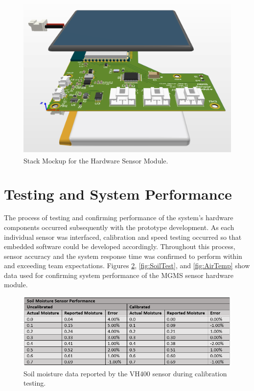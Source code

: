 \documentclass{report}
\begin{document}
\begin{figure}[H] %
    \centering
    \includegraphics[height=3.25in]{PNGs/FinalAssy.PNG}
    \caption{Stack Mockup for the Hardware Sensor Module.}
    \label{fig:Stackup}
\end{figure}

\newpage
\section{Testing and System Performance}

The process of testing and confirming performance of the system's hardware components occurred subsequently with the prototype development. As each individual sensor was interfaced, calibration and speed testing occurred so that embedded software could be developed accordingly. Throughout this process, sensor accuracy and the system response time was confirmed to perform within and exceeding team expectations. Figures \ref{fig:SoilMoist}, \ref{fig:SoilTest}, and \ref{fig:AirTemp} show data used for confirming system performance of the MGMS sensor hardware module.\\

\begin{figure}[H] %
    \centering
    \includegraphics{PNGs/SoilMoistData.PNG}
    \caption{Soil moisture data reported by the VH400 sensor during calibration testing.}
    \label{fig:SoilMoist}
\end{figure}
\end{document}
